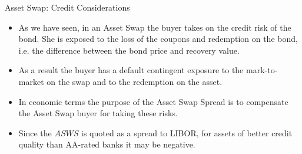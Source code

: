 \documentclass{beamer}
\begin{document}

\begin{frame}{Asset Swap: Credit Considerations}
	\begin{itemize}
		\item As we have seen, in an Asset Swap the buyer takes on the credit risk of the bond. She is exposed to the loss of the coupons and redemption on the bond, i.e. the difference between the bond price and recovery value.
		\item As a result the buyer has a default contingent exposure to the mark-to-market on the swap and to the redemption on the asset.  
		\item In economic terms the purpose of the Asset Swap Spread is to compensate the Asset Swap buyer for taking these risks.
		\item Since the $ASWS$ is quoted as a spread to LIBOR, for assets of better credit quality than AA-rated banks it may be negative.
	\end{itemize}
\end{frame}
\end{document}
